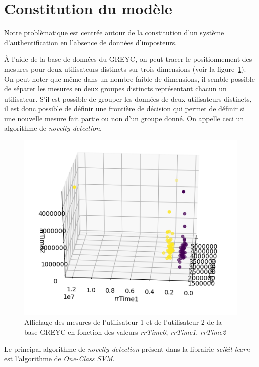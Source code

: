 \section{Constitution du modèle}

Notre problèmatique est centrée autour de la constitution d'un système d'authentification en l'absence de données d'imposteurs.

À l'aide de la base de données du GREYC, on peut tracer le positionnement des mesures pour deux utilisateurs distincts sur trois dimensions (voir la figure~\ref{3d}). On peut noter que même dans un nombre faible de dimensions, il semble possible de séparer les mesures en deux groupes distincts représentant chacun un utilisateur. S'il est possible de grouper les données de deux utilisateurs distincts, il est donc possible de définir une frontière de décision qui permet de définir si une nouvelle mesure fait partie ou non d'un groupe donné. On appelle ceci un algorithme de \textit{novelty detection}.

\begin{figure}[b]
    \centering
    \includegraphics[width=\linewidth]{res/3d.png}
    \caption{Affichage des mesures de l'utilisateur 1 et de l'utilisateur 2 de la base GREYC en fonction des valeurs \textit{rrTime0}, \textit{rrTime1}, \textit{rrTime2}}
    \label{3d}
\end{figure}

Le principal algorithme de \textit{novelty detection} présent dans la librairie \textit{scikit-learn} est l'algorithme de \textit{One-Class SVM}.

